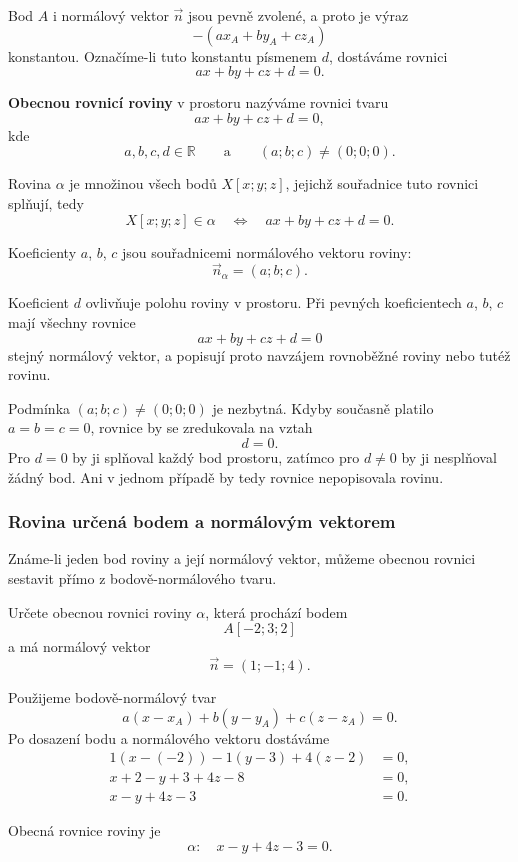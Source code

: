 Bod $A$ i normálový vektor $\vec{n}$ jsou pevně zvolené, a proto je
výraz
\[
    -(ax_A+by_A+cz_A)
\]
konstantou. Označíme-li tuto konstantu písmenem $d$, dostáváme rovnici
\[
    ax+by+cz+d=0.
\]

\begin{definition}
    \label{def:General_plane_equation}
    \textbf{Obecnou rovnicí roviny} v prostoru nazýváme rovnici tvaru
    \begin{equation}
        ax+by+cz+d=0,
        \label{eq:General_plane_equation}
    \end{equation}
    kde
    \[
        a,b,c,d\in\mathbb{R}
        \qquad\text{a}\qquad
        (a;b;c)\neq(0;0;0).
    \]

    Rovina $\alpha$ je množinou všech bodů $X[x;y;z]$, jejichž souřadnice
    tuto rovnici splňují, tedy
    \[
        X[x;y;z]\in\alpha
        \quad\Longleftrightarrow\quad
        ax+by+cz+d=0.
    \]
\end{definition}

Koeficienty $a$, $b$, $c$ jsou souřadnicemi normálového vektoru roviny:
\begin{equation}
    \vec{n}_{\alpha}=(a;b;c).
    \label{eq:Normal_vector_from_general_plane}
\end{equation}

Koeficient $d$ ovlivňuje polohu roviny v prostoru. Při pevných
koeficientech $a$, $b$, $c$ mají všechny rovnice
\[
    ax+by+cz+d=0
\]
stejný normálový vektor, a popisují proto navzájem rovnoběžné roviny nebo
tutéž rovinu.

Podmínka $(a;b;c)\neq(0;0;0)$ je nezbytná. Kdyby současně platilo
$a=b=c=0$, rovnice by se zredukovala na vztah
\[
    d=0.
\]
Pro $d=0$ by ji splňoval každý bod prostoru, zatímco pro $d\neq0$ by ji
nesplňoval žádný bod. Ani v jednom případě by tedy rovnice nepopisovala
rovinu.

\subsubsection{Rovina určená bodem a normálovým vektorem}
\label{subsubsec:Plane_point_normal_vector}

Známe-li jeden bod roviny a její normálový vektor, můžeme obecnou rovnici
sestavit přímo z bodově-normálového tvaru.

\begin{example}
    \label{exa:General_plane_point_normal}
    Určete obecnou rovnici roviny $\alpha$, která prochází bodem
    \[
        A[-2;3;2]
    \]
    a má normálový vektor
    \[
        \vec{n}=(1;-1;4).
    \]

    Použijeme bodově-normálový tvar
    \[
        a(x-x_A)+b(y-y_A)+c(z-z_A)=0.
    \]
    Po dosazení bodu a normálového vektoru dostáváme
    \begin{align*}
        1(x-(-2))-1(y-3)+4(z-2)&=0,\\
        x+2-y+3+4z-8&=0,\\
        x-y+4z-3&=0.
    \end{align*}

    Obecná rovnice roviny je
    \[
        \alpha:\quad x-y+4z-3=0.
    \]
\end{example}

